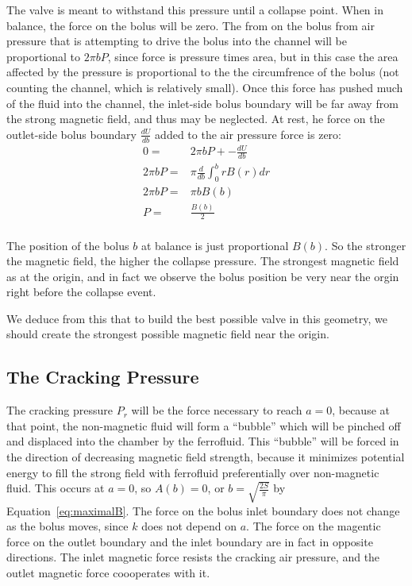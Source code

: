 \documentclass{asme2ej}
\begin{document}
The valve is meant to withstand this pressure until a collapse point.
When in balance, the force on the bolus will be zero.
The from on the bolus from air pressure that is attempting to drive the
bolus into the channel will be proportional to $2 \pi b P$, since force is pressure times
area, but in this case the area affected by the pressure is proportional
to the the circumfrence of the bolus (not counting the channel, which is relatively small).
Once this force has pushed much of the fluid into the channel, the inlet-side
bolus boundary will be far away
from the strong magnetic field, and thus may be neglected.
At rest,
he force on the outlet-side bolus boundary $\frac{d U}{db}$ added to the air pressure
force is zero:
\begin{align}
  0 = & 2 \pi b P + - \frac{d U}{db} \\
  2\pi b P = & \pi \frac{d }{db} \int_0^b r B(r) dr \\
  2\pi b P = &  \pi  b B(b)  \\
    P = &  \frac{B(b)}{2}  \\
\end{align}

The position of the bolus $b$ at balance is just proportional $B(b)$.
So the stronger the magnetic field, the higher the collapse pressure.
The strongest magnetic field as at the origin, and in fact we observe the bolus
position be very near the orgin right before the collapse event.

We deduce from this that to build the best possible valve in this geometry,
we should create the strongest possible magnetic field near the origin.


\subsection{The Cracking Pressure}

The cracking pressure $P_r$ will be the force necessary to reach $a = 0$, because at that point,
the non-magnetic fluid will form a ``bubble'' which will be pinched off and displaced into the chamber
by the ferrofluid. This ``bubble'' will be forced in the direction of decreasing magnetic field strength,
because it minimizes potential energy to fill the strong field with ferrofluid preferentially over
non-magnetic fluid. This occurs at $a = 0$, so $A(b) = 0$, or $b = \sqrt{\frac{2S}{\pi}}$ by Equation~\ref{eq:maximalB}.
The force on the bolus inlet boundary does not change as the bolus moves, since $k$ does not
depend on $a$.
The force on the magentic force on the outlet boundary and the inlet boundary
are in fact in opposite directions. The inlet magnetic force resists the cracking
air pressure, and the outlet magnetic force coooperates with it.
\end{document}
